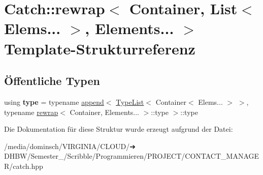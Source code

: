\hypertarget{structCatch_1_1rewrap_3_01Container_00_01List_3_01Elems_8_8_8_01_4_00_01Elements_8_8_8_01_4}{}\section{Catch\+:\+:rewrap$<$ Container, List$<$ Elems... $>$, Elements... $>$ Template-\/\+Strukturreferenz}
\label{structCatch_1_1rewrap_3_01Container_00_01List_3_01Elems_8_8_8_01_4_00_01Elements_8_8_8_01_4}
\subsection*{Öffentliche Typen}
\begin{DoxyCompactItemize}
\item 
\mbox{\label{structCatch_1_1rewrap_3_01Container_00_01List_3_01Elems_8_8_8_01_4_00_01Elements_8_8_8_01_4_a1dea55d690c2ee00d81e44dff797bd22}} 
using {\bfseries type} = typename \hyperlink{structCatch_1_1append}{append}$<$ \hyperlink{structCatch_1_1TypeList}{Type\+List}$<$ Container$<$ Elems... $>$ $>$, typename \hyperlink{structCatch_1_1rewrap}{rewrap}$<$ Container, Elements... $>$\+::type $>$\+::type
\end{DoxyCompactItemize}


Die Dokumentation für diese Struktur wurde erzeugt aufgrund der Datei\+:\begin{DoxyCompactItemize}
\item 
/media/dominsch/\+V\+I\+R\+G\+I\+N\+I\+A/\+C\+L\+O\+U\+D/➔ D\+H\+B\+W/\+Semester\+\_/\+Scribble/\+Programmieren/\+P\+R\+O\+J\+E\+C\+T/\+C\+O\+N\+T\+A\+C\+T\+\_\+\+M\+A\+N\+A\+G\+E\+R/catch.\+hpp\end{DoxyCompactItemize}
